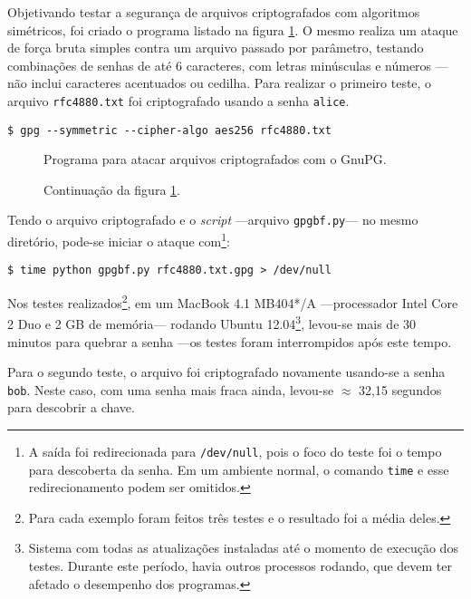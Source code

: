 \documentclass[12px,a4paper,twoside]{article}
\begin{document}
Objetivando testar a segurança de arquivos criptografados com algoritmos
simétricos, foi criado o programa listado na figura \ref{lst:gpgbf.py}.  O
mesmo realiza um ataque de força bruta simples contra um arquivo passado por
parâmetro, testando combinações de senhas de até 6 caracteres, com letras
minúsculas e números ---não inclui caracteres acentuados ou cedilha.  Para
realizar o primeiro teste, o arquivo \texttt{rfc4880.txt} foi criptografado
usando a senha \texttt{alice}.

\begin{verbatim}
$ gpg --symmetric --cipher-algo aes256 rfc4880.txt
\end{verbatim}

\begin{figure}
\caption{Programa para atacar arquivos criptografados com o GnuPG.}
\label{lst:gpgbf.py}
    
\end{figure}
\begin{figure}
\caption{Continuação da figura \ref{lst:gpgbf.py}.}
    
\end{figure}

Tendo o arquivo criptografado e o \textit{script} ---arquivo
\texttt{gpgbf.py}--- no mesmo diretório, pode-se iniciar o ataque
com\footnote{A saída foi redirecionada para \texttt{/dev/null}, pois o foco do
teste foi o tempo para descoberta da senha.  Em um ambiente normal, o comando
\texttt{time} e esse redirecionamento podem ser omitidos.}:

\begin{verbatim}
$ time python gpgbf.py rfc4880.txt.gpg > /dev/null
\end{verbatim}

Nos testes realizados\footnote{Para cada exemplo foram feitos três testes e o
resultado foi a média deles.}, em um MacBook 4.1 MB404*/A ---processador
Intel{\footnotesize \textsuperscript{\textregistered}} Core{\footnotesize
\textsuperscript{\texttrademark}} 2 Duo e 2 GB de memória--- rodando Ubuntu
12.04\footnote{Sistema com todas as atualizações instaladas até o momento de
execução dos testes.  Durante este período, havia outros processos rodando, que
devem ter afetado o desempenho dos programas.}, levou-se mais de 30 minutos
para quebrar a senha ---os testes foram interrompidos após este tempo.

Para o segundo teste, o arquivo foi criptografado novamente usando-se a senha
\texttt{bob}.  Neste caso, com uma senha mais fraca ainda, levou-se $\approx$
32,15 segundos para descobrir a chave.
\end{document}
